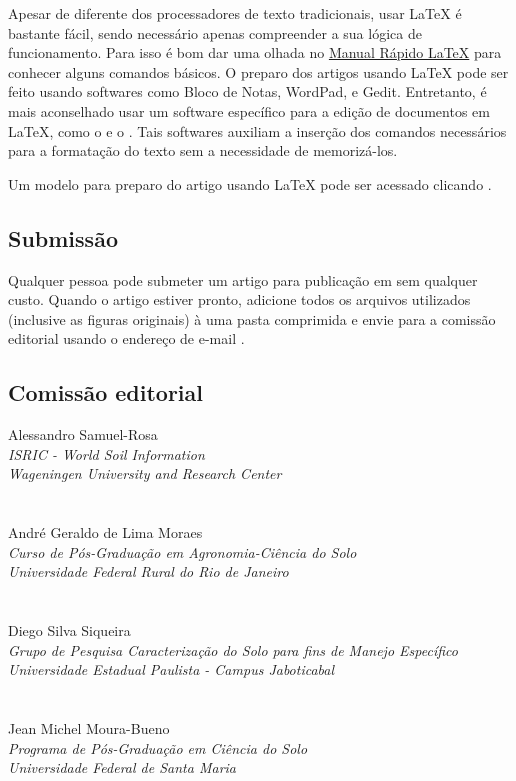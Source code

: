 Apesar de diferente dos processadores de texto tradicionais, usar \LaTeX{} é bastante fácil, sendo necessário apenas compreender a sua lógica de funcionamento. Para isso é bom dar uma olhada no \href{http://www.stdout.org/~winston/latex/}{Manual Rápido \LaTeX{}} para conhecer alguns comandos básicos. O preparo dos artigos usando \LaTeX{} pode ser feito usando softwares como Bloco de Notas, WordPad, e Gedit. Entretanto, é mais aconselhado usar um software específico para a edição de documentos em \LaTeX, como o \Kile{} e o \MiKTeX. Tais softwares auxiliam a inserção dos comandos necessários para a formatação do texto sem a necessidade de memorizá-los.

Um modelo para preparo do artigo usando \LaTeX{} pode ser acessado clicando \aquiLaTeX.

\subsection{Submissão}

Qualquer pessoa pode submeter um artigo para publicação em \pedometria{} sem qualquer custo. Quando o artigo estiver pronto, adicione todos os arquivos utilizados (inclusive as figuras originais) à uma pasta comprimida e envie para a comissão editorial usando o endereço de e-mail .

\subsection{Comissão editorial}

Alessandro Samuel-Rosa\\
\textit{ISRIC - World Soil Information}\\
\textit{Wageningen University and Research Center}\\
\\
\\
André Geraldo de Lima Moraes\\
\textit{Curso de Pós-Graduação em Agronomia-Ciência do Solo}\\
\textit{Universidade Federal Rural do Rio de Janeiro}\\
\\
\\
Diego Silva Siqueira\\
\textit{Grupo de Pesquisa Caracterização do Solo para fins de Manejo Específico}\\
\textit{Universidade Estadual Paulista - Campus Jaboticabal}\\
\\
\\
Jean Michel Moura-Bueno\\
\textit{Programa de Pós-Graduação em Ciência do Solo}\\
\textit{Universidade Federal de Santa Maria}\\

